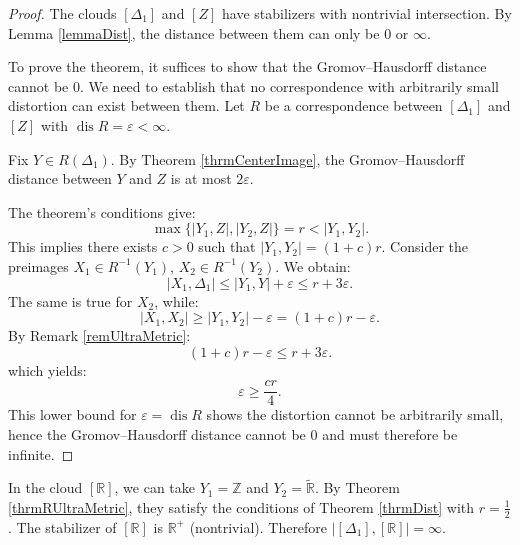 \documentclass[leqno]{article}
\begin{document}
\begin{proof}
The clouds $[\Delta_1]$ and $[Z]$ have stabilizers with nontrivial intersection. By Lemma \ref{lemmaDist}, the distance between them can only be $0$ or $\infty$.

To prove the theorem, it suffices to show that the Gromov--Hausdorff distance cannot be $0$. We need to establish that no correspondence with arbitrarily small distortion can exist between them. Let $R$ be a correspondence between $[\Delta_1]$ and $[Z]$ with $\operatorname{dis} R = \varepsilon < \infty$.

Fix $Y \in R(\Delta_1)$. By Theorem \ref{thrmCenterImage}, the Gromov--Hausdorff distance between $Y$ and $Z$ is at most $2\varepsilon$.

The theorem's conditions give:
$$
\max\{ |Y_{1},Z|, |Y_{2}, Z| \} = r < |Y_{1}, Y_{2}|.
$$
This implies there exists $c > 0$ such that $|Y_{1},Y_{2}| = (1 + c)r$. Consider the preimages $X_1 \in R^{-1}(Y_{1})$, $X_2 \in R^{-1}(Y_{2})$. We obtain:
$$
|X_1, \Delta_1| \leq |Y_{1}, Y| + \varepsilon \leq r + 3\varepsilon.
$$
The same is true for $X_2$, while:
$$
|X_1, X_2| \geq |Y_{1}, Y_{2}| - \varepsilon = (1+c)r - \varepsilon.
$$
By Remark \ref{remUltraMetric}:
$$
(1+c)r - \varepsilon \leq r + 3\varepsilon.
$$
which yields:
$$
\varepsilon \geq \frac{cr}{4}.
$$
This lower bound for $\varepsilon = \operatorname{dis} R$ shows the distortion cannot be arbitrarily small, hence the Gromov--Hausdorff distance cannot be $0$ and must therefore be infinite.
\end{proof}

\begin{corollary}
In the cloud $[\mathbb{R}]$, we can take $Y_{1} = \mathbb{Z}$ and $Y_{2} = \widetilde{\mathbb{R}}$. By Theorem \ref{thrmRUltraMetric}, they satisfy the conditions of Theorem \ref{thrmDist} with $r = \frac{1}{2}$. The stabilizer of $[\mathbb{R}]$ is $\mathbb{R}^{+}$ (nontrivial). Therefore $\big|[\Delta_{1}],[\mathbb{R}]\big| = \infty$.
\end{corollary}
\end{document}
